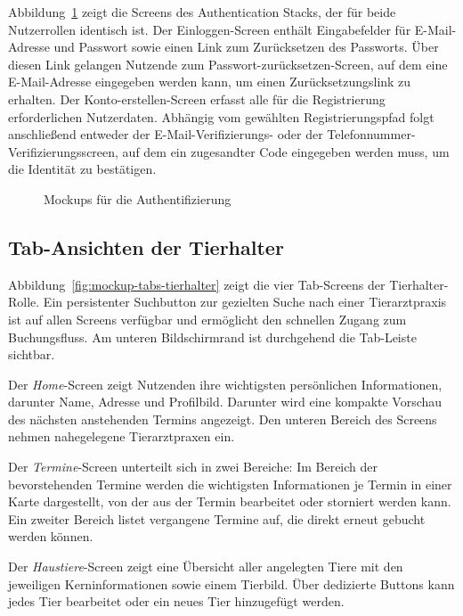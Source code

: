 Abbildung~\ref{fig:mockup-auth} zeigt die Screens des Authentication Stacks, der für beide Nutzerrollen identisch ist. Der Einloggen-Screen 
enthält Eingabefelder für E-Mail-Adresse und Passwort sowie einen Link zum Zurücksetzen des Passworts. Über diesen Link gelangen Nutzende zum Passwort-zurücksetzen-Screen, auf dem eine E-Mail-Adresse eingegeben werden kann, um einen Zurücksetzungslink zu erhalten. Der Konto-erstellen-Screen erfasst alle für die Registrierung erforderlichen Nutzerdaten. Abhängig vom gewählten
Registrierungspfad folgt anschließend entweder der
E-Mail-Verifizierungs- oder der Telefonnummer-Verifizierungsscreen, auf dem ein zugesandter Code eingegeben werden muss, um die
Identität zu bestätigen.

\clearpage
\begin{figure}[H]
    \centering
    
    \caption{Mockups für die Authentifizierung}
    \label{fig:mockup-auth}
\end{figure}
\clearpage
\subsection{Tab-Ansichten der Tierhalter}

Abbildung~\ref{fig:mockup-tabs-tierhalter} zeigt die vier Tab-Screens der Tierhalter-Rolle. Ein persistenter Suchbutton zur gezielten Suche nach einer Tierarztpraxis ist auf allen Screens verfügbar und ermöglicht den schnellen Zugang zum Buchungsfluss. Am unteren Bildschirmrand ist 
durchgehend die Tab-Leiste sichtbar.

Der \textit{Home}-Screen zeigt Nutzenden ihre wichtigsten persönlichen Informationen, darunter Name, Adresse und Profilbild. Darunter wird eine kompakte Vorschau des nächsten anstehenden Termins angezeigt. Den unteren Bereich des Screens nehmen nahegelegene Tierarztpraxen ein.

Der \textit{Termine}-Screen unterteilt sich in zwei Bereiche: Im Bereich der bevorstehenden Termine werden die wichtigsten Informationen je Termin in einer Karte dargestellt, von der aus der Termin bearbeitet oder storniert werden kann. Ein zweiter Bereich listet vergangene Termine auf, die direkt erneut gebucht werden können.

Der \textit{Haustiere}-Screen zeigt eine Übersicht aller angelegten Tiere mit den jeweiligen Kerninformationen sowie einem Tierbild. Über dedizierte Buttons kann jedes Tier bearbeitet oder ein neues Tier hinzugefügt werden.

